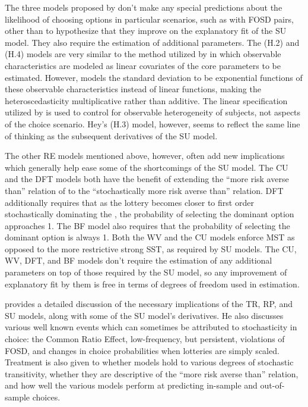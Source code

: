 \documentclass[../main.tex]{subfiles}
\begin{document}
The three models proposed by \textcite{Hey1995} don't make any special predictions about the likelihood of choosing options in particular scenarios, such as with FOSD pairs, other than to hypothesize that they improve on the explanatory fit of the SU model.
They also require the estimation of additional parameters.
The (H.2) and (H.4) models are very similar to the method utilized by \textcite[142]{Harrison2008a} in which observable characteristics are modeled as linear covariates of the core parameters to be estimated.
However, \textcite{Hey1995} models the standard deviation to be exponential functions of these observable characteristics instead of linear functions, making the heteroscedasticity multiplicative rather than additive.
The linear specification utilized by \textcite{Harrison2008a} is used to control for observable heterogeneity of subjects, not aspects of the choice scenario.
Hey's (H.3) model, however, seems to reflect the same line of thinking as the subsequent derivatives of the SU model.

The other RE models mentioned above, however, often add new implications which generally help ease some of the shortcomings of the SU model.
The CU and the DFT models both have the benefit of extending the \enquote{more risk averse than} relation of \textcite{Pratt1964} to the \enquote{stochastically more risk averse than} relation.
DFT additionally requires that as the lottery becomes closer to first order stochastically dominating the {\CE}, the probability of selecting the dominant option approaches 1.
The BF model also requires that the probability of selecting the dominant option is always 1.
Both the WV and the CU models enforce MST as opposed to the more restrictive strong SST,  as required by SU models.
The CU, WV, DFT, and BF models don't require the estimation of any additional parameters on top of those required by the SU model, so any improvement of explanatory fit by them is free in terms of degrees of freedom used in estimation.

\textcite{Wilcox2008} provides a detailed discussion of the necessary implications of the TR, RP,  and SU models, along with some of the SU model's derivatives.
He also discusses various well known events which can sometimes be attributed to stochasticity in choice: the Common Ratio Effect, low-frequency, but persistent, violations of FOSD, and changes in choice probabilities when lotteries are simply scaled.{\footnotemark}
Treatment is also given to whether models hold to various degrees of stochastic transitivity, whether they are descriptive of the \enquote{more risk averse than} relation, and how well the various models perform at predicting in-sample and out-of-sample choices.{\footnotemark}
\end{document}
